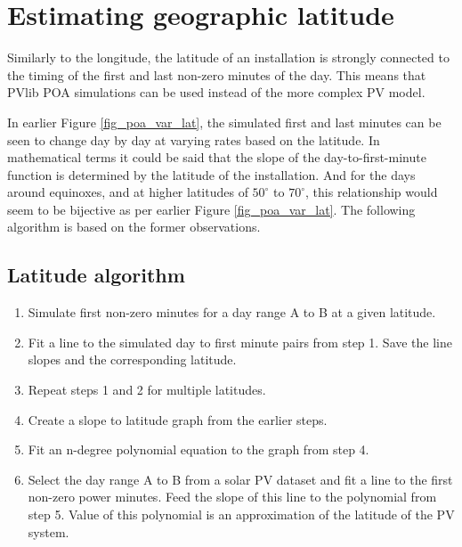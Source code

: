 
\newpage 
\section{Estimating geographic latitude}
Similarly to the longitude, the latitude of an installation is strongly connected to the timing of the first and last non-zero minutes of the day. This means that PVlib POA simulations can be used instead of the more complex PV model.

In earlier Figure \ref{fig_poa_var_lat}, the simulated first and last minutes can be seen to change day by day at varying rates based on the latitude. In mathematical terms it could be said that the slope of the day-to-first-minute function is determined by the latitude of the installation. And for the days around equinoxes, and at higher latitudes of $50^\circ$ to $70^\circ$, this relationship would seem to be bijective as per earlier Figure \ref{fig_poa_var_lat}. The following algorithm is based on the former observations.


\hfill


\subsection{Latitude algorithm}
\begin{enumerate}
  \item Simulate first non-zero minutes for a day range A to B at a given latitude.
  
  \item Fit a line to the simulated day to first minute pairs from step 1. Save the line slopes and the corresponding latitude.
  
  \item Repeat steps 1 and 2 for multiple latitudes.
  
  \item Create a slope to latitude graph from the earlier steps.
  
  \item Fit an n-degree polynomial equation to the graph from step 4.
  
  \item Select the day range A to B from a solar PV dataset and fit a line to the first non-zero power minutes. Feed the slope of this line to the polynomial from step 5. Value of this polynomial is an approximation of the latitude of the PV system.
  
 
  
\end{enumerate}


